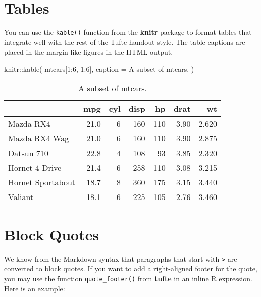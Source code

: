 \documentclass[a4paper,14pt]{tufte-handout}
\newenvironment{Shaded}{}{}
\newcommand{\AttributeTok}[1]{\textcolor[rgb]{0.49,0.56,0.16}{#1}}
\newcommand{\DecValTok}[1]{\textcolor[rgb]{0.25,0.63,0.44}{#1}}
\newcommand{\FunctionTok}[1]{\textcolor[rgb]{0.02,0.16,0.49}{#1}}
\newcommand{\NormalTok}[1]{#1}
\newcommand{\SpecialCharTok}[1]{\textcolor[rgb]{0.25,0.44,0.63}{#1}}
\newcommand{\StringTok}[1]{\textcolor[rgb]{0.25,0.44,0.63}{#1}}
\begin{document}
\hypertarget{tables}{%
\section{Tables}\label{tables}}

You can use the \texttt{kable()} function from the \textbf{knitr}
package to format tables that integrate well with the rest of the Tufte
handout style. The table captions are placed in the margin like figures
in the HTML output.

\begin{Shaded}
\begin{Highlighting}[numbers=left,,]
\NormalTok{knitr}\SpecialCharTok{::}\FunctionTok{kable}\NormalTok{(}
\NormalTok{  mtcars[}\DecValTok{1}\SpecialCharTok{:}\DecValTok{6}\NormalTok{, }\DecValTok{1}\SpecialCharTok{:}\DecValTok{6}\NormalTok{], }\AttributeTok{caption =} \StringTok{\textquotesingle{}A subset of mtcars.\textquotesingle{}}
\NormalTok{)}
\end{Highlighting}
\end{Shaded}

\begin{table}

\caption{\label{tab:unnamed-chunk-4}A subset of mtcars.}
\centering
\begin{tabular}[t]{l|r|r|r|r|r|r}
\hline
  & mpg & cyl & disp & hp & drat & wt\\
\hline
Mazda RX4 & 21.0 & 6 & 160 & 110 & 3.90 & 2.620\\
\hline
Mazda RX4 Wag & 21.0 & 6 & 160 & 110 & 3.90 & 2.875\\
\hline
Datsun 710 & 22.8 & 4 & 108 & 93 & 3.85 & 2.320\\
\hline
Hornet 4 Drive & 21.4 & 6 & 258 & 110 & 3.08 & 3.215\\
\hline
Hornet Sportabout & 18.7 & 8 & 360 & 175 & 3.15 & 3.440\\
\hline
Valiant & 18.1 & 6 & 225 & 105 & 2.76 & 3.460\\
\hline
\end{tabular}
\end{table}

\hypertarget{block-quotes}{%
\section{Block Quotes}\label{block-quotes}}

We know from the Markdown syntax that paragraphs that start with
\texttt{\textgreater{}} are converted to block quotes. If you want to
add a right-aligned footer for the quote, you may use the function
\texttt{quote\_footer()} from \textbf{tufte} in an inline R expression.
Here is an example:
\end{document}
